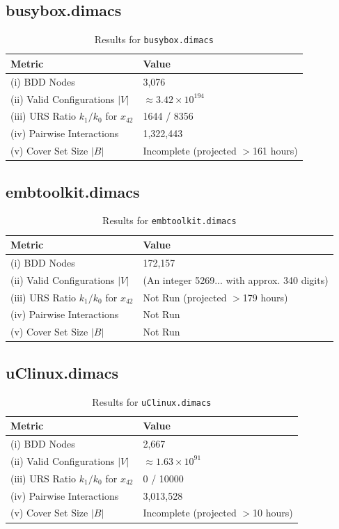 \documentclass{article}
\begin{document}
\subsection{busybox.dimacs}
\begin{table}[H]
\centering
\caption{Results for \texttt{busybox.dimacs}}
\begin{tabular}{l l}
\toprule
\textbf{Metric} & \textbf{Value} \\
\midrule
(i) BDD Nodes & 3,076 \\
(ii) Valid Configurations $|V|$ & $\approx 3.42 \times 10^{194}$ \\
(iii) URS Ratio $k_1/k_0$ for $x_{42}$ & 1644 / 8356 \\
(iv) Pairwise Interactions & 1,322,443 \\
(v) Cover Set Size $|B|$ & Incomplete (projected $>$161 hours) \\
\bottomrule
\end{tabular}
\end{table}

\subsection{embtoolkit.dimacs}
\begin{table}[H]
\centering
\caption{Results for \texttt{embtoolkit.dimacs}}
\begin{tabular}{l p{7cm}}
\toprule
\textbf{Metric} & \textbf{Value} \\
\midrule
(i) BDD Nodes & 172,157 \\
(ii) Valid Configurations $|V|$ & (An integer 5269... with approx. 340 digits) \\
(iii) URS Ratio $k_1/k_0$ for $x_{42}$ & Not Run (projected $>$179 hours) \\
(iv) Pairwise Interactions & Not Run \\
(v) Cover Set Size $|B|$ & Not Run \\
\bottomrule
\end{tabular}
\end{table}

\subsection{uClinux.dimacs}
\begin{table}[H]
\centering
\caption{Results for \texttt{uClinux.dimacs}}
\begin{tabular}{l l}
\toprule
\textbf{Metric} & \textbf{Value} \\
\midrule
(i) BDD Nodes & 2,667 \\
(ii) Valid Configurations $|V|$ & $\approx 1.63 \times 10^{91}$ \\
(iii) URS Ratio $k_1/k_0$ for $x_{42}$ & 0 / 10000 \\
(iv) Pairwise Interactions & 3,013,528 \\
(v) Cover Set Size $|B|$ & Incomplete (projected $>$10 hours) \\
\bottomrule
\end{tabular}
\end{table}
\end{document}
